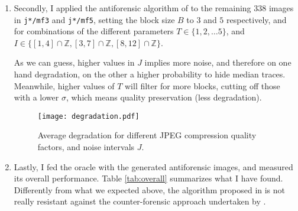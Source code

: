 \documentclass[10pt,a4paper]{report}
\newcommand{\code}[1]{\texttt{#1}}
\begin{document}
\begin{enumerate}
\begin{table}[!htbp]
    \caption{Detection accuracies achieved by using the first 1000 second-order LTP
      features extracted from the \textsc{ucid} dataset, for JPEG compression
      100, 90. Dataset \code{mf35} contains both $3 \times 3 $ median filtered
      images, and $5 \times 5$ ones, in equal percentage. In both tables, the
      last two rows present the very same mix, but for datasets of
      respectively $64 \times 64$ and $256 \times 256$ pixels of
      size, in oder to give a glimpse about the overall trend for different
      image sizes.}
\end{table}

\item Secondly, I applied the antiforensic algorithm of \cite{antiforensic} to
  the remaining $338$ images in \code{j*/mf3} and \code{j*/mf5}, setting the
  block size $B$ to $3$ and $5$ respectively, and for combinations of the
  different parameters $T \in \{1, 2, \dots 5\}$, and $I \in \{ [1, 4] \cap
  \mathbb{Z}, [3, 7] \cap
  \mathbb{Z}, [8, 12] \cap \mathbb{Z}\}$.

 As we can guess, higher values in $J$ implies more noise, and therefore on
 one hand degradation, on the other a higher probability to hide median
 traces. Meanwhile, higher values of $T$ will filter for more blocks, cutting off
 those with a lower $\sigma$, which means quality preservation (less degradation).

 \begin{figure}[!htbp]
   \centering
   \texttt{[image: degradation.pdf]}
  \caption{Average degradation for different JPEG compression quality factors, and noise
    intervals $J$. \label{img:degradation}}
\end{figure}

\item Lastly, I fed the oracle with the generated antiforensic images, and
  measured its overall performance. Table \ref{tab:overall} summarizes what I
  have found.
  Differently from what we expected above, the algorithm proposed in  \cite{mediantraces}
  is not really resistant against the counter-forensic approach undertaken by
  \cite{antiforensic}.


\end{enumerate}
\end{document}
